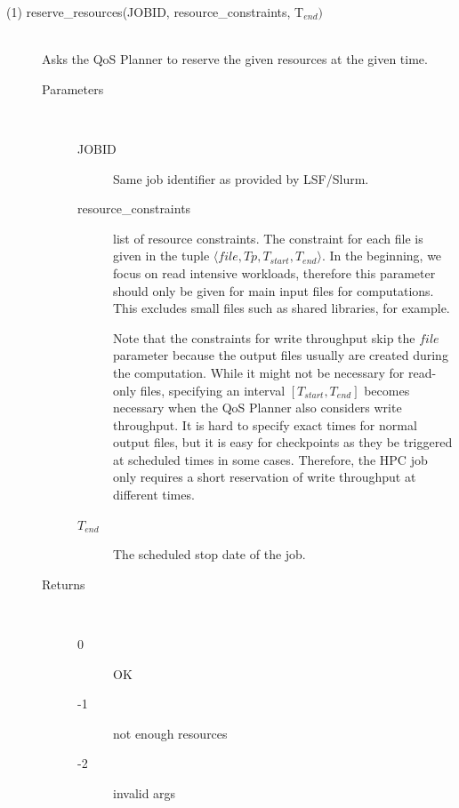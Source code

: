 \documentclass[10pt]{article}
\begin{document}
\begin{description}

\item[(1) reserve\_resources(JOBID, resource\_constraints, T$_{end})$]~\\ Asks the QoS Planner to reserve the given resources at the given time.
\begin{description}
    \item[Parameters]~\\
        \begin{description}
            \item[JOBID] Same job identifier as provided by LSF/Slurm.
            \item[resource\_constraints] list of resource constraints.
            The constraint for each file is given in the tuple $\langle file, Tp, T_{start}, T_{end}\rangle$.
            In the beginning, we focus on read intensive workloads, therefore this parameter should only be given for main input files for computations.
            This excludes small files such as shared libraries, for example.

            Note that the constraints for write throughput skip the $file$ parameter because the output files usually are created during the computation.
            While it might not be necessary for read-only files, specifying an interval $[T_{start}, T_{end}]$ becomes necessary when the QoS Planner also considers write throughput.
            It is hard to specify exact times for normal output files, but it is easy for checkpoints as they be triggered at scheduled times in some cases.
            Therefore, the HPC job only requires a short reservation of write throughput at different times.
            \item[$T_{end}$] The scheduled stop date of the job.
        \end{description}
    \item[Returns]~\\
        \begin{description}
            \item[0] OK
            \item[-1] not enough resources
            \item[-2] invalid args
        \end{description}
  \end{description}



\end{description}
\end{document}
